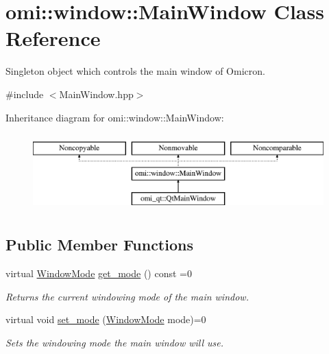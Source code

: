 \hypertarget{classomi_1_1window_1_1_main_window}{}\section{omi\+:\+:window\+:\+:Main\+Window Class Reference}
\label{classomi_1_1window_1_1_main_window}


Singleton object which controls the main window of Omicron.  




{\ttfamily \#include $<$Main\+Window.\+hpp$>$}

Inheritance diagram for omi\+:\+:window\+:\+:Main\+Window\+:\begin{figure}[H]
\begin{center}
\leavevmode
\includegraphics[height=3.000000cm]{classomi_1_1window_1_1_main_window}
\end{center}
\end{figure}
\subsection*{Public Member Functions}
\begin{DoxyCompactItemize}
\item 
virtual \hyperlink{namespaceomi_1_1window_a096dc3d82796b93c067bca535fc0f94e}{Window\+Mode} \hyperlink{classomi_1_1window_1_1_main_window_a79b2016501c95af6cdd66df0277773fb}{get\+\_\+mode} () const =0\hypertarget{classomi_1_1window_1_1_main_window_a79b2016501c95af6cdd66df0277773fb}{}\label{classomi_1_1window_1_1_main_window_a79b2016501c95af6cdd66df0277773fb}

\begin{DoxyCompactList}\small\item\em Returns the current windowing mode of the main window. \end{DoxyCompactList}\item 
virtual void \hyperlink{classomi_1_1window_1_1_main_window_aea247b966ad921d2107d8b64b751735d}{set\+\_\+mode} (\hyperlink{namespaceomi_1_1window_a096dc3d82796b93c067bca535fc0f94e}{Window\+Mode} mode)=0\hypertarget{classomi_1_1window_1_1_main_window_aea247b966ad921d2107d8b64b751735d}{}\label{classomi_1_1window_1_1_main_window_aea247b966ad921d2107d8b64b751735d}

\begin{DoxyCompactList}\small\item\em Sets the windowing mode the main window will use. \end{DoxyCompactList}\end{DoxyCompactItemize}
